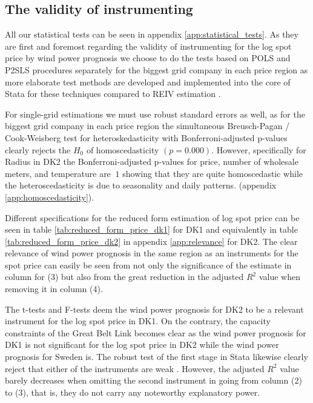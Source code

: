 \subsection{The validity of instrumenting}
\label{subsec:r_validity}
All our statistical tests can be seen in appendix \ref{app:statistical_tests}. As they are first and foremost regarding the validity of instrumenting for the log spot price by wind power prognosis we choose to do the tests based on POLS and P2SLS procedures separately for the biggest grid company in each price region as more elaborate test methods are developed and implemented into the core of Stata for these techniques compared to REIV estimation \citep{statacorp2017stata}.
\bigskip\par
For single-grid estimations we must use robust standard errors as well, as for the biggest grid company in each price region the simultaneous Breusch-Pagan / Cook-Weisberg test for heteroskedasticity with Bonferroni-adjusted p-values clearly rejects the $H_0$ of homoscedasticity $(p=0.000)$. However, specifically for Radius in DK2 the Bonferroni-adjusted p-values for price, number of wholesale meters, and temperature are $~1$ showing that they are quite homoscedastic while the heteroscedasticity is due to seasonality and daily patterns.
 (appendix \ref{app:homoscedasticity}).
\bigskip\par
Different specifications for the reduced form estimation of log spot price can be seen in table \ref{tab:reduced_form_price_dk1} for DK1 and equivalently in table \ref{tab:reduced_form_price_dk2} in appendix \ref{app:relevance} for DK2. The clear relevance of wind power prognosis in the same region as an instruments for the spot price can easily be seen from not only the significance of the estimate in column for (3) but also from the great reduction in the adjusted $R^2$ value when removing it in column (4).
\par
The t-tests and F-tests deem the wind power prognosis for DK2 to be a relevant instrument for the log spot price in DK1. On the contrary, the capacity constraints of the Great Belt Link becomes clear as the wind power prognosis for DK1 is not significant for the log spot price in DK2 while the wind power prognosis for Sweden is. The robust test of the first stage in Stata likewise clearly reject that either of the instruments are weak \citep{statacorp2017stata}. However, the adjusted $R^2$ value barely decreases when omitting the second instrument in going from column (2) to (3), that is, they do not carry any noteworthy explanatory power.

